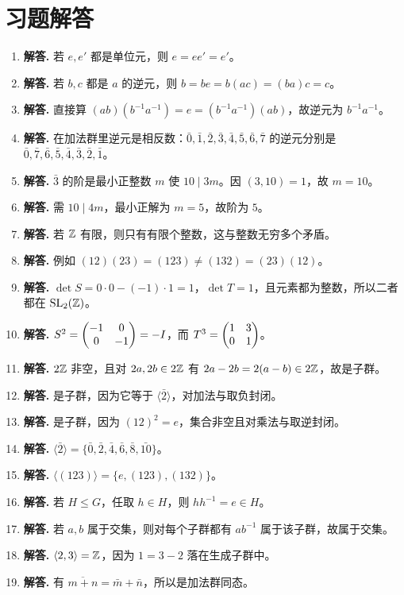 \section*{习题解答}
\begin{enumerate}[label=\textbf{\arabic*.}, leftmargin=*, itemsep=1em]
\item \textbf{解答.} 若 $e,e'$ 都是单位元，则 $e=ee'=e'$。
\item \textbf{解答.} 若 $b,c$ 都是 $a$ 的逆元，则 $b=be=b(ac)=(ba)c=c$。
\item \textbf{解答.} 直接算 $(ab)(b^{-1}a^{-1})=e=(b^{-1}a^{-1})(ab)$，故逆元为 $b^{-1}a^{-1}$。
\item \textbf{解答.} 在加法群里逆元是相反数：$\bar0,\bar1,\bar2,\bar3,\bar4,\bar5,\bar6,\bar7$ 的逆元分别是 $\bar0,\bar7,\bar6,\bar5,\bar4,\bar3,\bar2,\bar1$。
\item \textbf{解答.} $\bar3$ 的阶是最小正整数 $m$ 使 $10\mid 3m$。因 $(3,10)=1$，故 $m=10$。
\item \textbf{解答.} 需 $10\mid 4m$，最小正解为 $m=5$，故阶为 $5$。
\item \textbf{解答.} 若 $\mathbb{Z}$ 有限，则只有有限个整数，这与整数无穷多个矛盾。
\item \textbf{解答.} 例如 $(12)(23)=(123)\ne(132)=(23)(12)$。
\item \textbf{解答.} $\det S=0\cdot0-(-1)\cdot1=1$，$\det T=1$，且元素都为整数，所以二者都在 $\mathrm{SL}_2(\mathbb{Z})$。
\item \textbf{解答.} $S^2=\begin{pmatrix} -1&0\\0&-1 \end{pmatrix}=-I$，而 $T^3=\begin{pmatrix} 1&3\\0&1 \end{pmatrix}$。
\item \textbf{解答.} $2\mathbb{Z}$ 非空，且对 $2a,2b\in2\mathbb{Z}$ 有 $2a-2b=2(a-b)\in2\mathbb{Z}$，故是子群。
\item \textbf{解答.} 是子群，因为它等于 $\langle\bar2\rangle$，对加法与取负封闭。
\item \textbf{解答.} 是子群，因为 $(12)^2=e$，集合非空且对乘法与取逆封闭。
\item \textbf{解答.} $\langle\bar2\rangle=\{\bar0,\bar2,\bar4,\bar6,\bar8,\bar{10}\}$。
\item \textbf{解答.} $\langle(123)\rangle=\{e,(123),(132)\}$。
\item \textbf{解答.} 若 $H\le G$，任取 $h\in H$，则 $hh^{-1}=e\in H$。
\item \textbf{解答.} 若 $a,b$ 属于交集，则对每个子群都有 $ab^{-1}$ 属于该子群，故属于交集。
\item \textbf{解答.} $\langle2,3\rangle=\mathbb{Z}$，因为 $1=3-2$ 落在生成子群中。
\item \textbf{解答.} 有 $\overline{m+n}=\bar m+\bar n$，所以是加法群同态。

\end{enumerate}
